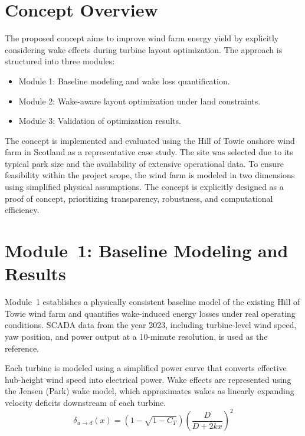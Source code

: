 \documentclass[lettersize,journal]{IEEEtran}
\begin{document}
\section{Concept Overview}

The proposed concept aims to improve wind farm energy yield by explicitly considering wake effects during turbine layout optimization. The approach is structured into three modules:
\begin{itemize}
    \item Module 1: Baseline modeling and wake loss quantification.
    \item Module 2: Wake-aware layout optimization under land constraints.
    \item Module 3: Validation of optimization results.
\end{itemize}

The concept is implemented and evaluated using the Hill of Towie onshore wind farm in Scotland as a representative case study. The site was selected due to its typical park size and the availability of extensive operational data. To ensure feasibility within the project scope, the wind farm is modeled in two dimensions using simplified physical assumptions. The concept is explicitly designed as a proof of concept, prioritizing transparency, robustness, and computational efficiency.


\section{Module~1: Baseline Modeling and Results}

Module~1 establishes a physically consistent baseline model of the existing Hill of Towie wind farm and quantifies wake-induced energy losses under real operating conditions. SCADA data from the year 2023, including turbine-level wind speed, yaw position, and power output at a 10-minute resolution, is used as the reference.

Each turbine is modeled using a simplified power curve that converts effective hub-height wind speed into electrical power. Wake effects are represented using the Jensen (Park) wake model, which approximates wakes as linearly expanding velocity deficits downstream of each turbine. 
\begin{equation}
\delta_{u \rightarrow d}(x)
=
\left(
1 - \sqrt{1 - C_T}
\right)
\left(
\frac{D}{D + 2 k x}
\right)^2
\end{equation}
\end{document}
